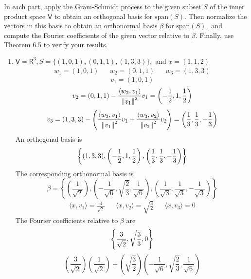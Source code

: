 In each part, apply the Gram-Schmidt process to the given subset $S$
of the inner product space $\mathsf{V}$ to obtain an orthogonal basis
for $\text{span}(S).$ Then normalize the vectors in this basis to
obtain an orthonormal basis $\beta$ for $\text{span}(S),$ and compute
the Fourier coefficients of the given vector relative to $\beta.$
Finally, use Theorem 6.5 to verify your results.
\begin{enumerate}
\item $\mathsf{V} = \mathsf{R}^3, S= \{(1,0,1),(0,1,1),(1,3,3)\},$ and
  $x = (1,1,2)$
\begin{align}
w_1 = (1,0,1) & & w_2 = (0,1,1) & & w_3 = (1,3,3)
\end{align}
\begin{equation}
v_1 = (1,0,1)
\end{equation}
\begin{equation}
v_2 = (0,1,1) - \frac{\langle w_2,v_1 \rangle}{\left\lVert v_1\right\rVert^2}v_1 = \left(-\frac{1}{2},1,\frac{1}{2}\right)
\end{equation}
\begin{equation}
v_3 = (1,3,3) - \left( \frac{\langle w_3,v_1\rangle}{\left\lVert v_1\right\rVert^2}v_1
  +  \frac{\langle w_3,v_2\rangle}{\left\lVert v_2\right\rVert^2}v_2\right) = \left(\frac{1}{3},\frac{1}{3},-\frac{1}{3}\right)
\end{equation}
An orthogonal basis is
\begin{equation}
\notag \left\{(1,3,3),\left(-\frac{1}{2},1,\frac{1}{2}\right),\left(\frac{1}{3},\frac{1}{3},-\frac{1}{3}\right)\right\}
\end{equation}
The corresponding orthonormal basis is
\begin{equation}
\beta = \left\{\left(\frac{1}{\sqrt{2}}\right),\left(-\frac{1}{\sqrt{6}},\sqrt{\frac{2}{3}},\frac{1}{\sqrt{6}}\right),\left(\frac{1}{\sqrt{3}},\frac{1}{\sqrt{3}},-\frac{1}{\sqrt{3}}\right)\right\}
\end{equation}
\begin{align}
\langle x,v_1\rangle = \frac{3}{\sqrt{2}} & & \langle x,v_2\rangle =
\sqrt{\frac{3}{2}} && \langle x,v_3\rangle = 0
\end{align}
The Fourier coefficients relative to $\beta$ are
\begin{equation}
\notag \left\{\frac{3}{\sqrt{2}},\sqrt{\frac{3}{3}},0\right\}
\end{equation}
\begin{equation}
\left(\frac{3}{\sqrt{2}}\right)\left(\frac{1}{\sqrt{2}}\right) +
\left(\sqrt{\frac{3}{2}}\right)\left(-\frac{1}{\sqrt{6}},\sqrt{\frac{2}{3}},\frac{1}{\sqrt{6}}\right)

\end{equation}
\end{enumerate}
